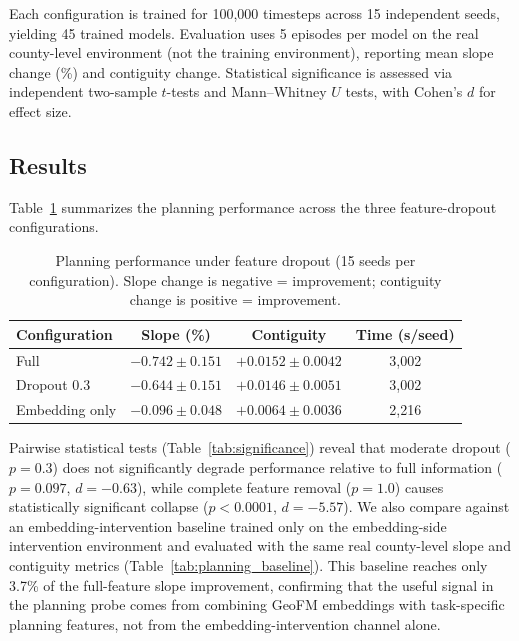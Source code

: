 \documentclass{article}
\begin{document}
Each configuration is trained for 100{,}000 timesteps across 15 independent seeds, yielding 45 trained models. Evaluation uses 5 episodes per model on the real county-level environment (not the training environment), reporting mean slope change (\%) and contiguity change. Statistical significance is assessed via independent two-sample $t$-tests and Mann--Whitney $U$ tests, with Cohen's $d$ for effect size.

\subsection{Results}

Table~\ref{tab:dropout} summarizes the planning performance across the three feature-dropout configurations.

\begin{table}[htbp]
\centering
\caption{Planning performance under feature dropout (15 seeds per configuration). Slope change is negative = improvement; contiguity change is positive = improvement.}
\label{tab:dropout}
\footnotesize
\begin{tabular*}{\textwidth}{@{\extracolsep{\fill}}lccc@{}}
\toprule
Configuration & Slope (\%) & Contiguity & Time (s/seed) \\
\midrule
Full & $-0.742 \pm 0.151$ & $+0.0152 \pm 0.0042$ & 3{,}002 \\
Dropout 0.3 & $-0.644 \pm 0.151$ & $+0.0146 \pm 0.0051$ & 3{,}002 \\
Embedding only & $-0.096 \pm 0.048$ & $+0.0064 \pm 0.0036$ & 2{,}216 \\
\bottomrule
\end{tabular*}
\end{table}

Pairwise statistical tests (Table~\ref{tab:significance}) reveal that moderate dropout ($p=0.3$) does not significantly degrade performance relative to full information ($p = 0.097$, $d = -0.63$), while complete feature removal ($p=1.0$) causes statistically significant collapse ($p < 0.0001$, $d = -5.57$). We also compare against an embedding-intervention baseline trained only on the embedding-side intervention environment and evaluated with the same real county-level slope and contiguity metrics (Table~\ref{tab:planning_baseline}). This baseline reaches only 3.7\% of the full-feature slope improvement, confirming that the useful signal in the planning probe comes from combining GeoFM embeddings with task-specific planning features, not from the embedding-intervention channel alone.
\end{document}
